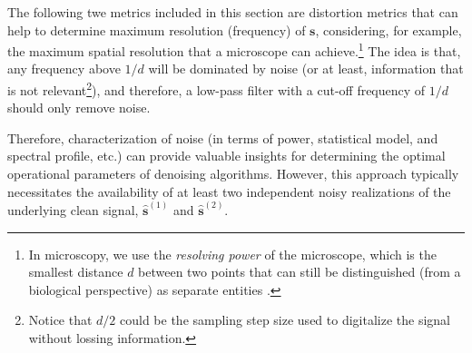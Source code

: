 The following twe metrics included in this section are distortion
metrics that can help to determine maximum resolution (frequency) of
$\mathbf{s}$, considering, for example, the maximum spatial resolution
that a microscope can achieve.\footnote{In microscopy, we use the
  \emph{resolving power} of the microscope, which is the smallest
  distance $d$ between two points that can still be distinguished
  (from a biological perspective) as separate entities
  \cite{nieuwenhuizen2013measuring}.} The idea is that, any frequency
above $1/d$ will be dominated by noise (or at least, information that
is not relevant\footnote{Notice that $d/2$ could be the sampling step
  size used to digitalize the signal without lossing information.}),
and therefore, a low-pass filter with a cut-off frequency of $1/d$
should only remove noise.

Therefore, characterization of noise (in terms of power, statistical
model, and spectral profile, etc.) can provide valuable insights for
determining the optimal operational parameters of denoising
algorithms. However, this approach typically necessitates the
availability of at least two independent noisy realizations of the
underlying clean signal, $\hat{\mathbf{s}}^{(1)}$ and
$\hat{\mathbf{s}}^{(2)}$.

\begin{comment}
Noise can be additive or multiplicative. In the first case, noise is
signal independent between samples of the same signal instance, and
between samples of different instances, even if we consider the same
sample index. In the second case, the power of the noise depends on
the power of the signal, and therefore, if we can estimate the signal,
we can estimate, for example, the local variance of the noise after
supposing some statistical model. Notice, however, that in any case,
we must known, at least two (inevitable noisy) instances of the clean
signal.
\end{comment}

\begin{comment}
This requirement often presents a significant
challenge, particularly in contexts where samples are susceptible to
the degradation caused by the microscope radiation, thereby limiting
the feasibility of acquiring multiple such instances.

When this is not possible, one way to simulate having two or more
noisy instances of the same clean signal is to distribute the
pixels/voxels across two or more images/volumes (see Appendices
\ref{sec:EOS}, \ref{sec:CBS}, \ref{sec:ICBS}, \ref{sec:SCBS}, and
\ref{sec:SPRS}). Unfortunately, the splitting reduces the spatial
resolution at which the signal/noise parameters can be successfully
estudied.
\end{comment}

